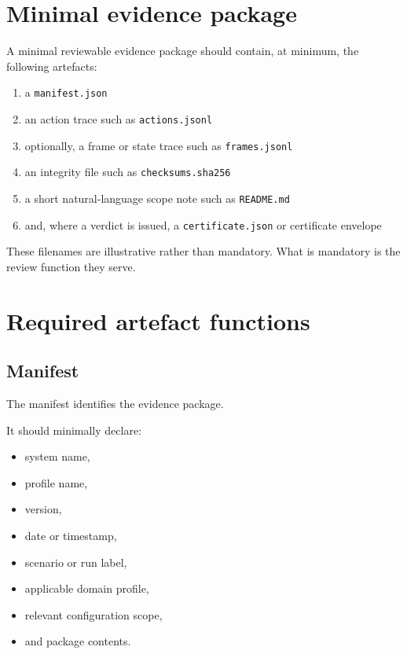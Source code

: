 \documentclass[11pt]{article}
\begin{document}
\section{Minimal evidence package}

A minimal reviewable evidence package should contain, at minimum, the following artefacts:

\begin{enumerate}[leftmargin=2em,label=\arabic*.]
    \item a \texttt{manifest.json}
    \item an action trace such as \texttt{actions.jsonl}
    \item optionally, a frame or state trace such as \texttt{frames.jsonl}
    \item an integrity file such as \texttt{checksums.sha256}
    \item a short natural-language scope note such as \texttt{README.md}
    \item and, where a verdict is issued, a \texttt{certificate.json} or certificate envelope
\end{enumerate}

These filenames are illustrative rather than mandatory. What is mandatory is the review function they serve.

\section{Required artefact functions}

\subsection{Manifest}

The manifest identifies the evidence package.

It should minimally declare:
\begin{itemize}[leftmargin=2em]
    \item system name,
    \item profile name,
    \item version,
    \item date or timestamp,
    \item scenario or run label,
    \item applicable domain profile,
    \item relevant configuration scope,
    \item and package contents.
\end{itemize}
\end{document}

